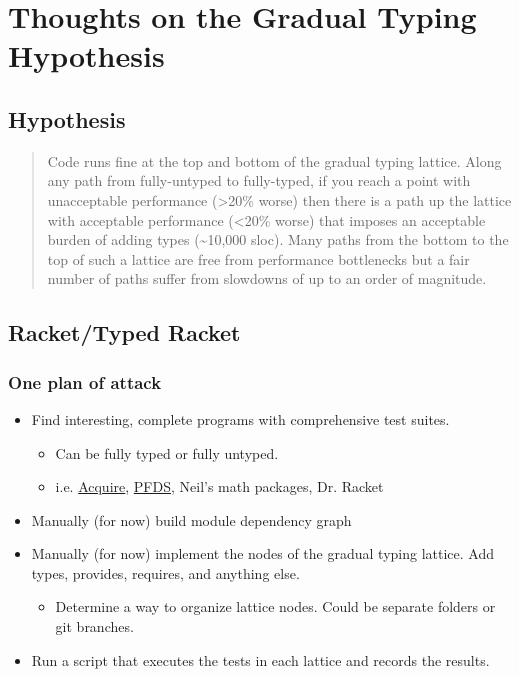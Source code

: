\documentclass[11pt]{article}
\begin{document}

\section{Thoughts on the Gradual Typing Hypothesis}
\label{sec-1}
\subsection{Hypothesis}
\label{sec-1-1}
  \begin{quote}
    Code runs fine at the top and bottom of the gradual typing lattice.
    Along any path from fully-untyped to fully-typed, if you reach a point with unacceptable performance (>20\% worse) then there is a path up the lattice with acceptable performance (<20\% worse) that imposes an acceptable burden of adding types (\~{}10,000 sloc).
    Many paths from the bottom to the top of such a lattice are free from performance bottlenecks but a fair number of paths suffer from slowdowns of up to an order of magnitude.
  \end{quote}
\subsection{Racket/Typed Racket}
\label{sec-1-2}
\subsubsection{One plan of attack}
\label{sec-1-2-1}

\begin{itemize}
\item Find interesting, complete programs with comprehensive test suites.
\begin{itemize}
\item Can be fully typed or fully untyped.
\item i.e. \href{https://github.com/mfelleisen/Acquire}{Acquire}, \href{https://github.com/takikawa/tr-pfds}{PFDS}, Neil's math packages, Dr. Racket
\end{itemize}
\item Manually (for now) build module dependency graph
\item Manually (for now) implement the nodes of the gradual typing lattice.
    Add types, provides, requires, and anything else.
\begin{itemize}
\item Determine a way to organize lattice nodes. Could be separate folders or git branches.
\end{itemize}
\item Run a script that executes the tests in each lattice and records the results.
\end{itemize}
\end{document}

